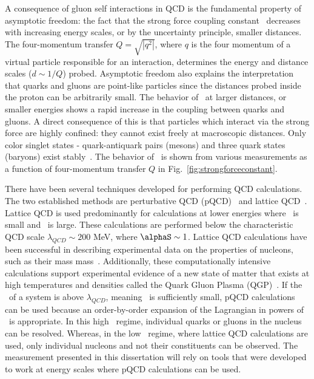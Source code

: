 A consequence of gluon self interactions in QCD is the fundamental property of asymptotic freedom: the fact that the strong force coupling constant \alphaqs\ decreases with increasing energy scales, or by the uncertainty principle, smaller distances. The four-momentum transfer $Q=\sqrt{|q^{2}|}$, where $q$ is the four momentum of a virtual particle responsible for an interaction, determines the energy and distance scales ($d\sim 1/Q$) probed. Asymptotic freedom also explains the interpretation that quarks and gluons are point-like particles since the distances probed inside the proton can be arbitrarily small. The behavior of \alphaS\ at larger distances, or smaller energies shows a rapid increase in the coupling between quarks and gluons. A direct consequence of this is that particles which interact via the strong force are highly confined: they cannot exist freely at macroscopic distances. Only color singlet states - quark-antiquark pairs (mesons) and three quark states (baryons) exist stably~\cite{Seymour:2005hs}.  The behavior of \alphaS\ is shown from various measurements as a function of four-momentum transfer $Q$ in Fig.~\ref{fig:strongforceconstant}. 

There have been several techniques developed for performing QCD calculations. The two established methods are perturbative QCD (pQCD)~\cite{Brock:1993sz} and lattice QCD~\cite{creutz1985quarks}. Lattice QCD is used predominantly for calculations at lower energies where \qsquare\ is small and \alphaS\ is large. These calculations are performed below the characteristic QCD scale $\lambda_{QCD}\sim200$ MeV, where $\alphaS\sim 1$. Lattice QCD calculations have been successful in describing experimental data on the properties of nucleons, such as their mass mass~\cite{Borsanyi:2014jba}. Additionally, these computationally intensive calculations support experimental evidence of a new state of matter that exists at high temperatures and densities called the Quark Gluon Plasma (QGP)~\cite{Harris:1996zx,Adcox:2004mh,Adams:2005dq,Arsene:2004fa,Back:2004je}. If the \qsquare\ of a system is above $\lambda_{QCD}$, meaning \alphaS\ is sufficiently small, pQCD calculations can be used because an order-by-order expansion of the Lagrangian in powers of \alphaS\ is appropriate. In this high \qsquare\ regime, individual quarks or gluons in the nucleus can be resolved. Whereas, in the low \qsquare\ regime, where lattice QCD calculations are used, only individual nucleons and not their constituents can be observed. The measurement presented in this dissertation will rely on tools that were developed to work at energy scales where pQCD calculations can be used.

